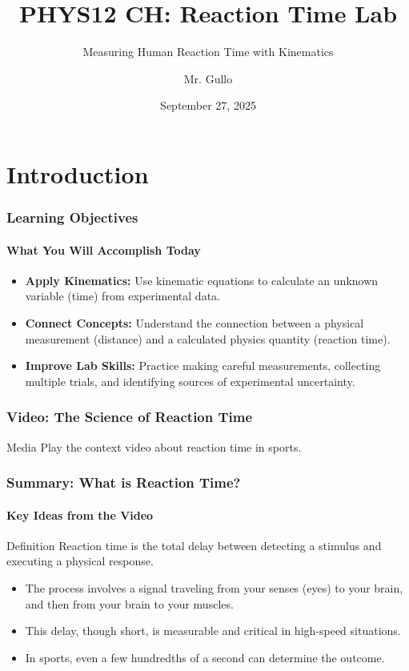 \documentclass{beamer}
\title[Reaction Time Lab]{PHYS12 CH: Reaction Time Lab}
\subtitle{Measuring Human Reaction Time with Kinematics}
\author[Mr. Gullo]{Mr. Gullo}
\date[Sep 27, 2025]{September 27, 2025}
\begin{document}
\frame{\titlepage}

\section{Introduction}

\begin{frame}
\frametitle{Learning Objectives}
\framesubtitle{What You Will Accomplish Today}
    \begin{itemize}
        \item \textbf{Apply Kinematics:} Use kinematic equations to calculate an unknown variable (time) from experimental data.
        \item \textbf{Connect Concepts:} Understand the connection between a physical measurement (distance) and a calculated physics quantity (reaction time).
        \item \textbf{Improve Lab Skills:} Practice making careful measurements, collecting multiple trials, and identifying sources of experimental uncertainty.
    \end{itemize}
\end{frame}

\begin{frame}
\frametitle{Video: The Science of Reaction Time}
    \vfill
    \begin{alertblock}{Media}
        Play the context video about reaction time in sports.
    \end{alertblock}
    \vfill
\end{frame}

\begin{frame}
\frametitle{Summary: What is Reaction Time?}
\framesubtitle{Key Ideas from the Video}
    \begin{block}{Definition}
        Reaction time is the total delay between detecting a stimulus and executing a physical response.
    \end{block}
    \pause
    \begin{itemize}
        \item The process involves a signal traveling from your senses (eyes) to your brain, and then from your brain to your muscles. \pause
        \item This delay, though short, is measurable and critical in high-speed situations. \pause
        \item In sports, even a few hundredths of a second can determine the outcome.
    \end{itemize}
\end{frame}
\end{document}
